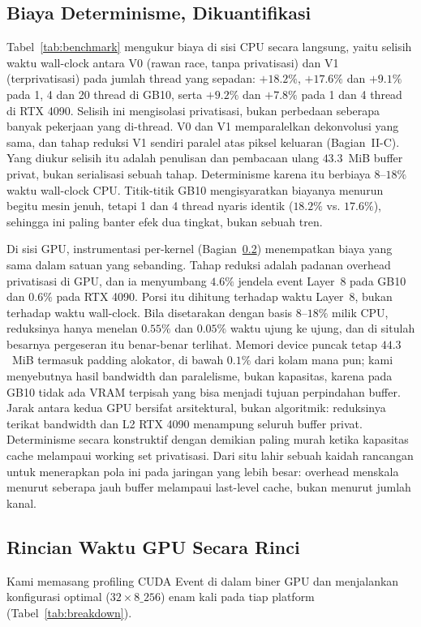 \documentclass[conference]{IEEEtran}
\begin{document}
\subsection{Biaya Determinisme, Dikuantifikasi}
\label{sec:cost-of-determinism}
Tabel~\ref{tab:benchmark} mengukur biaya di sisi CPU secara langsung, yaitu selisih waktu wall-clock antara V0 (rawan race, tanpa privatisasi) dan V1 (terprivatisasi) pada jumlah thread yang sepadan: $+18.2\%$, $+17.6\%$ dan $+9.1\%$ pada 1, 4 dan 20 thread di GB10, serta $+9.2\%$ dan $+7.8\%$ pada 1 dan 4 thread di RTX 4090. Selisih ini mengisolasi privatisasi, bukan perbedaan seberapa banyak pekerjaan yang di-thread. V0 dan V1 memparalelkan dekonvolusi yang sama, dan tahap reduksi V1 sendiri paralel atas piksel keluaran (Bagian~II-C). Yang diukur selisih itu adalah penulisan dan pembacaan ulang $43.3$~MiB buffer privat, bukan serialisasi sebuah tahap. Determinisme karena itu berbiaya $8$--$18\%$ waktu wall-clock CPU. Titik-titik GB10 mengisyaratkan biayanya menurun begitu mesin jenuh, tetapi 1 dan 4 thread nyaris identik ($18.2\%$ vs. $17.6\%$), sehingga ini paling banter efek dua tingkat, bukan sebuah tren.

Di sisi GPU, instrumentasi per-kernel (Bagian~\ref{sec:breakdown}) menempatkan biaya yang sama dalam satuan yang sebanding. Tahap reduksi adalah padanan overhead privatisasi di GPU, dan ia menyumbang $4.6\%$ jendela event Layer~8 pada GB10 dan $0.6\%$ pada RTX 4090. Porsi itu dihitung terhadap waktu Layer~8, bukan terhadap waktu wall-clock. Bila disetarakan dengan basis $8$--$18\%$ milik CPU, reduksinya hanya menelan $0.55\%$ dan $0.05\%$ waktu ujung ke ujung, dan di situlah besarnya pergeseran itu benar-benar terlihat. Memori device puncak tetap $44.3$~MiB termasuk padding alokator, di bawah $0.1\%$ dari kolam mana pun; kami menyebutnya hasil bandwidth dan paralelisme, bukan kapasitas, karena pada GB10 tidak ada VRAM terpisah yang bisa menjadi tujuan perpindahan buffer. Jarak antara kedua GPU bersifat arsitektural, bukan algoritmik: reduksinya terikat bandwidth dan L2 RTX 4090 menampung seluruh buffer privat. Determinisme secara konstruktif dengan demikian paling murah ketika kapasitas cache melampaui working set privatisasi. Dari situ lahir sebuah kaidah rancangan untuk menerapkan pola ini pada jaringan yang lebih besar: overhead menskala menurut seberapa jauh buffer melampaui last-level cache, bukan menurut jumlah kanal.

\subsection{Rincian Waktu GPU Secara Rinci}
\label{sec:breakdown}
Kami memasang profiling CUDA Event di dalam biner GPU dan menjalankan konfigurasi optimal ($32{\times}8\_256$) enam kali pada tiap platform (Tabel~\ref{tab:breakdown}).
\end{document}
